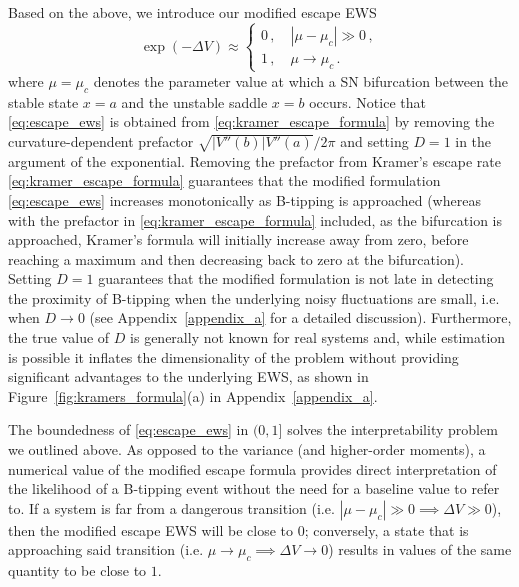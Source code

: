 \documentclass[a4paper,fleqn]{cas-sc}
\newcommand{\aref}[1]{Appendix~\ref{#1}}
\newcommand{\fref}[1]{Figure~\ref{#1}}
\begin{document}
Based on the above, we introduce our modified escape EWS
%
\begin{equation}\label{eq:escape_ews}
        \exp(-\Delta V) \approx 
   \begin{cases}
       0\,, \quad |\mu - \mu_{c}| \gg 0\,,\\
       1\,, \quad \mu \to \mu_{c}\,. 
   \end{cases}
\end{equation}
%
where $\mu=\mu_c$ denotes the parameter value at which a SN bifurcation between the stable state $x=a$ and the unstable saddle $x=b$ occurs.
Notice that \eqref{eq:escape_ews} is obtained from \eqref{eq:kramer_escape_formula} by removing the curvature-dependent prefactor $\sqrt{|V''(b)|V''(a)}/2\pi$ and setting $D=1$ in the argument of the exponential.
Removing the prefactor from Kramer's escape rate \eqref{eq:kramer_escape_formula} guarantees that the modified formulation \eqref{eq:escape_ews} increases monotonically as B-tipping is approached (whereas with the prefactor in \eqref{eq:kramer_escape_formula} included, as the bifurcation is approached, Kramer's formula will initially increase away from zero, before reaching a maximum and then decreasing back to zero at the bifurcation).
Setting $D=1$ guarantees that the modified formulation is not late in detecting the proximity of B-tipping when the underlying noisy fluctuations are small, i.e. when $D\to0$  (see \aref{appendix_a} for a detailed discussion).
Furthermore, the true value of $D$ is generally not known for real systems and, while estimation is possible it inflates the dimensionality of the problem without providing significant advantages to the underlying EWS, as shown in \fref{fig:kramers_formula}(a) in \aref{appendix_a}.

The boundedness of \eqref{eq:escape_ews} in $(0,1]$ solves the interpretability problem we outlined above.
As opposed to the variance (and higher-order moments), a numerical value of the modified escape formula provides direct interpretation of the likelihood of a B-tipping event without the need for a baseline value to refer to.
If a system is far from a dangerous transition (i.e. $|\mu-\mu_c|\gg0\implies\Delta V\gg0$), then the modified escape EWS will be close to $0$; conversely, a state that is approaching said transition (i.e. $\mu\to\mu_c\implies\Delta V\to0$) results in values of the same quantity to be close to $1$.
\end{document}
